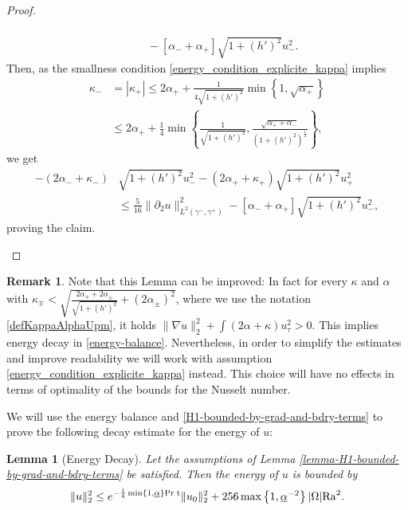 \documentclass{article}
\newtheorem{lemma}[theorem]{Lemma}
\theoremstyle{definition}
\theoremstyle{definition}
\newtheorem{remark}{Remark}[section]
\newcommand{\Pra}{\rm{Pr}}
\newcommand{\Ra}{{\rm{Ra}}}
\begin{document}
\begin{proof}
\begin{itemize}
\begin{align*}
        \\
        &\qquad - \left[\alpha_-+\alpha_+\right]\sqrt{1+(h')^2}u_-^2.
    \end{align*}
    Then, as the smallness condition \eqref{energy_condition_explicite_kappa} implies
    \begin{align*}
        \kappa_- &= |\kappa_+| \leq 2\alpha_+ + \frac{1}{4\sqrt{1+(h')^2}} \min\left\lbrace 1, \sqrt{\alpha_+} \right\rbrace
        \\
        &\leq 2\alpha_+ + \frac{1}{4} \min\left\lbrace \frac{1}{\sqrt{1+(h')^2}}, \frac{\sqrt{\alpha_++\alpha_-}}{(1+(h')^2)^\frac{1}{4}} \right\rbrace,
    \end{align*}
    we get \vspace{-5pt}    \begin{align*}
        - (2\alpha_-+\kappa_-)&\sqrt{1+(h')^2}u_-^2 -(2\alpha_++\kappa_+)\sqrt{1+(h')^2}u_+^2
        \\
        &\leq  \frac{5}{16}\|\partial_2 u\|_{L^2(\gamma^-,\gamma^+)}^2 - \left[\alpha_-+\alpha_+\right]\sqrt{1+(h')^2}u_-^2,
    \end{align*}
    proving the claim.
\end{itemize}
\vspace{-5pt}
\end{proof}

\begin{remark}
Note that this Lemma can be improved: In fact for every $\kappa$ and $\alpha$ with $\kappa_\mp < \sqrt{\frac{2\alpha_\mp+2\alpha_\pm}{\sqrt{1+(h')^2}}+(2\alpha_\pm)^2}$,
where we use the notation \eqref{defKappaAlphaUpm}, it holds $\|\nabla u\|_2^2+\int (2\alpha+\kappa)u_\tau^2 > 0$. This implies energy decay in \eqref{energy-balance}.
\newline
Nevertheless, in order to simplify the estimates and improve readability we will work with assumption \eqref{energy_condition_explicite_kappa} instead. This choice will have no effects in terms of optimality of the bounds for the Nusselt number. 
\end{remark}


We will use the energy balance and \eqref{H1-bounded-by-grad-and-bdry-terms} to prove the following decay estimate for the energy of $u$:
\begin{lemma}[Energy Decay]
\label{lemmaEnergyDecay}
Let the assumptions of Lemma \ref{lemma-H1-bounded-by-grad-and-bdry-terms} be satisfied. Then the energy of $u$ is bounded by
\begin{align}
    \label{Energy-decay}
    \|u\|_2^2 \leq e^{-\frac{1}{4}\min\lbrace 1, \underline{\alpha}\rbrace \Pra\phantom{.}  t}\|u_0\|_2^2 + 256 \max\left\lbrace 1, \underline{\alpha}^{-2}\right\rbrace|\Omega|\Ra^2.
\end{align}
\end{lemma}
\end{document}
